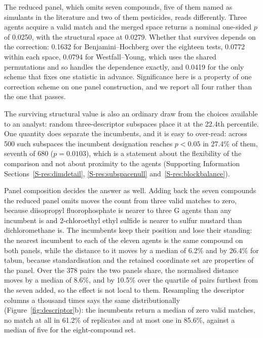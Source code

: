 \documentclass[journal=jacsat,manuscript=article,margin=1in]{achemso}
\begin{document}
The reduced panel, which omits seven compounds, five of them named as simulants
in the literature and two of them pesticides, reads differently. Three agents
acquire a valid match and the merged space returns a nominal one-sided $p$ of
0.0250, with the structural space at 0.0279. Whether that survives depends on
the correction: 0.1632 for Benjamini--Hochberg over the eighteen tests, 0.0772
within each space, 0.0794 for Westfall--Young, which uses the shared
permutations and so handles the dependence exactly, and 0.0419 for the only
scheme that fixes one statistic in advance. Significance here is a property of
one correction scheme on one panel construction, and we report all four rather
than the one that passes.

The surviving structural value is also an ordinary draw from the choices
available to an analyst: random three-descriptor subspaces place it at the
22.4th percentile. One quantity does separate the incumbents, and it is easy
to over-read: across 500 such subspaces the incumbent designation reaches
$p<0.05$ in 27.4\% of them, seventh of 680 ($p=0.0103$), which is a statement
about the flexibility of the comparison and not about proximity to the agents
(Supporting Information Sections~\ref{S-res:dimdetail},
\ref{S-res:subspacenull} and~\ref{S-res:blockbalance}).

Panel composition decides the answer as well. Adding back the seven compounds
the reduced panel omits moves the count from three
valid matches to zero, because diisopropyl fluorophosphate is nearer to three G
agents than any incumbent is and 2-chloroethyl ethyl sulfide is nearer to
sulfur mustard than dichloromethane is. The incumbents keep their position and
lose their standing: the nearest incumbent to each of the eleven agents is the
same compound on both panels, while the distance to it moves by a median of
6.2\% and by 26.4\% for tabun, because standardisation and the retained
coordinate set are properties of the panel. Over the 378 pairs the two panels share, the normalised distance moves by a
median of 8.6\%, and by 10.5\% over the quartile of pairs furthest from the
seven added, so the effect is not local to them. Resampling the
descriptor columns a thousand times says the same distributionally
(Figure~\ref{fig:descriptor}b): the incumbents return a median of zero valid
matches, no match at all in 61.2\% of replicates and at most one in 85.6\%,
against
a median of five for the eight-compound set.
\end{document}
